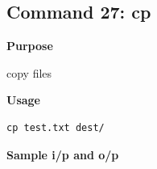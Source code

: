 \subsection{Command 27: cp} 
\textbf{Purpose}
\begin{flushleft}
 copy files
\end{flushleft}
\textbf{Usage}
\begin{verbatim}
cp test.txt dest/
\end{verbatim}
\textbf{Sample i/p and o/p}
\begin{figure}[H] 
\end{figure}

